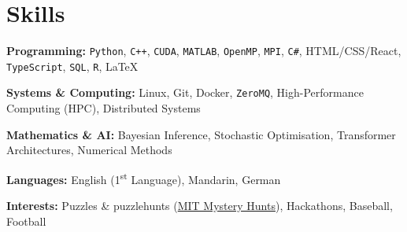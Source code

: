 \documentclass{cv}
\begin{document}
\section{Skills}
\begin{subsections}
    \item \textbf{Programming:} \verb|Python|, \verb|C++|, \verb|CUDA|, \verb|MATLAB|, \verb|OpenMP|, \verb|MPI|, \verb|C#|, HTML/CSS/React, \verb|TypeScript|, \verb|SQL|, \verb|R|, \LaTeX
    \item \textbf{Systems \& Computing:} Linux, Git, Docker, \verb|ZeroMQ|, High-Performance Computing (HPC), Distributed Systems
    \item \textbf{Mathematics \& AI:} Bayesian Inference, Stochastic Optimisation, Transformer Architectures, Numerical Methods
    \item \textbf{Languages:} English (1\textsuperscript{st} Language), Mandarin, German
    \item \textbf{Interests:} Puzzles \& puzzlehunts (\href{https://puzzles.mit.edu/}{MIT Mystery Hunts}), Hackathons, Baseball, Football
\end{subsections}
\end{document}
